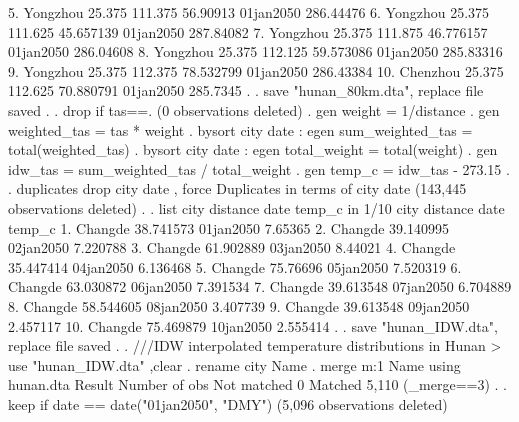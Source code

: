   5. {\VBAR} Yongzhou   25.375   111.375    56.90913   01jan2050   286.44476 {\VBAR}
     {\LFTT}
  6. {\VBAR} Yongzhou   25.375   111.625   45.657139   01jan2050   287.84082 {\VBAR}
  7. {\VBAR} Yongzhou   25.375   111.875   46.776157   01jan2050   286.04608 {\VBAR}
  8. {\VBAR} Yongzhou   25.375   112.125   59.573086   01jan2050   285.83316 {\VBAR}
  9. {\VBAR} Yongzhou   25.375   112.375   78.532799   01jan2050   286.43384 {\VBAR}
 10. {\VBAR} Chenzhou   25.375   112.625   70.880791   01jan2050    285.7345 {\VBAR}
     {\BLC}
{\smallskip}
. 
. save "hunan_80km.dta", replace
file{} saved
{\smallskip}
. 
. drop if tas==.
(0 observations deleted)
{\smallskip}
. gen weight  = 1/distance
{\smallskip}
. gen weighted_tas = tas * weight
{\smallskip}
. bysort city date : egen sum_weighted_tas = total(weighted_tas)
{\smallskip}
. bysort city date : egen total_weight = total(weight)
{\smallskip}
. gen idw_tas = sum_weighted_tas / total_weight
{\smallskip}
. gen temp_c = idw_tas - 273.15
{\smallskip}
. 
. duplicates drop city date , force
{\smallskip}
Duplicates in terms of city date
{\smallskip}
(143,445 observations deleted)
{\smallskip}
. 
. list city  distance date  temp_c in 1/10
{\smallskip}
     {\TLC}
     {\VBAR}    city    distance        date     temp_c {\VBAR}
     {\LFTT}
  1. {\VBAR} Changde   38.741573   01jan2050    7.65365 {\VBAR}
  2. {\VBAR} Changde   39.140995   02jan2050   7.220788 {\VBAR}
  3. {\VBAR} Changde   61.902889   03jan2050    8.44021 {\VBAR}
  4. {\VBAR} Changde   35.447414   04jan2050   6.136468 {\VBAR}
  5. {\VBAR} Changde    75.76696   05jan2050   7.520319 {\VBAR}
     {\LFTT}
  6. {\VBAR} Changde   63.030872   06jan2050   7.391534 {\VBAR}
  7. {\VBAR} Changde   39.613548   07jan2050   6.704889 {\VBAR}
  8. {\VBAR} Changde   58.544605   08jan2050   3.407739 {\VBAR}
  9. {\VBAR} Changde   39.613548   09jan2050   2.457117 {\VBAR}
 10. {\VBAR} Changde   75.469879   10jan2050   2.555414 {\VBAR}
     {\BLC}
{\smallskip}
. 
. save "hunan_IDW.dta", replace
file{} saved
{\smallskip}
. 
. ///IDW interpolated temperature distributions in Hunan
> use "hunan_IDW.dta" ,clear
{\smallskip}
. rename city Name
{\smallskip}
. merge m:1 Name using hunan.dta
{\smallskip}
    Result                      Number of obs
    Not matched                             0
    Matched                             5,110  (_merge==3)
{\smallskip}
. 
. keep if date == date("01jan2050", "DMY")
(5,096 observations deleted)
